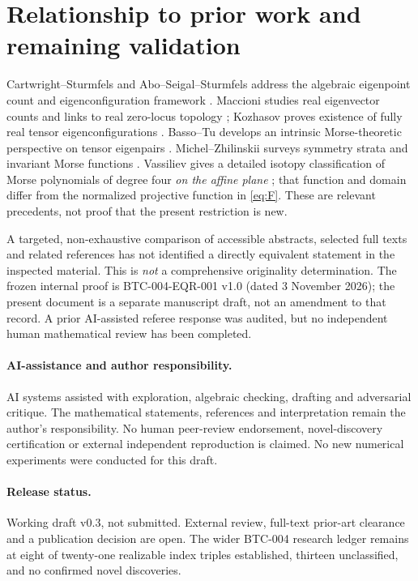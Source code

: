 \documentclass[10pt,a4paper]{article}
\theoremstyle{plain}
\theoremstyle{remark}
\begin{document}
\section{Relationship to prior work and remaining validation}
Cartwright--Sturmfels and Abo--Seigal--Sturmfels address the algebraic eigenpoint count and eigenconfiguration framework \cite{cartwright2013,abo2017}. Maccioni studies real eigenvector counts and links to real zero-locus topology \cite{maccioni2018}; Kozhasov proves existence of fully real tensor eigenconfigurations \cite{kozhasov2018}. Basso--Tu develops an intrinsic Morse-theoretic perspective on tensor eigenpairs \cite{bassotu2020}. Michel--Zhilinskii surveys symmetry strata and invariant Morse functions \cite{michel2001}. Vassiliev gives a detailed isotopy classification of Morse polynomials of degree four \emph{on the affine plane} \cite{vassiliev2025}; that function and domain differ from the normalized projective function in \eqref{eq:F}. These are relevant precedents, not proof that the present restriction is new.

A targeted, non-exhaustive comparison of accessible abstracts, selected full texts and related references has not identified a directly equivalent statement in the inspected material. This is \emph{not} a comprehensive originality determination. The frozen internal proof is BTC-004-EQR-001 v1.0 (dated 3 November 2026); the present document is a separate manuscript draft, not an amendment to that record. A prior AI-assisted referee response was audited, but no independent human mathematical review has been completed.

\paragraph{AI-assistance and author responsibility.} AI systems assisted with exploration, algebraic checking, drafting and adversarial critique. The mathematical statements, references and interpretation remain the author's responsibility. No human peer-review endorsement, novel-discovery certification or external independent reproduction is claimed. No new numerical experiments were conducted for this draft.

\paragraph{Release status.} Working draft v0.3, not submitted. External review, full-text prior-art clearance and a publication decision are open. The wider BTC-004 research ledger remains at eight of twenty-one realizable index triples established, thirteen unclassified, and no confirmed novel discoveries.
\end{document}
